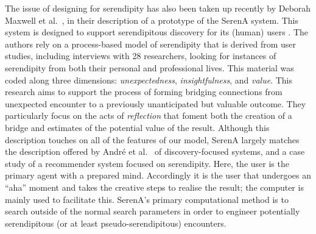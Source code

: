 The issue of designing for serendipity has also been taken up recently
by Deborah Maxwell et al.~\citeyear{maxwell2012designing}, in their
description of a prototype of the {\sf SerenA} system.  This system is
designed to support serendipitous discovery for its (human) users
\cite{forth2013serena}.  The authors rely on a process-based model of
serendipity \cite{Makri2012,Makri2012a} that is derived from user
studies, including interviews with 28 researchers, looking for
instances of serendipity from both their personal and professional
lives.  This material was coded along three dimensions:
\emph{unexpectedness}, \emph{insightfulness}, and \emph{value}.  This
research aims to support the process of forming bridging connections
from unexpected encounter to a previously unanticipated but valuable
outcome.  They particularly focus on the acts of \emph{reflection}
that foment both the creation of a bridge and estimates of the
potential value of the result.
%
Although this description touches on all of the features of our model, {\sf
  SerenA} largely matches the description offered by Andr{\'e} et
al.~\citeyear{andre2009discovery} of discovery-focused systems, and a
case study of a recommender system focused on serendipity.  Here, the
user is the primary agent with a prepared mind.  Accordingly it is the
user that undergoes an ``aha'' moment and takes the creative steps to
realise the result; the computer is mainly used to facilitate this.
{\sf SerenA}'s primary computational method is to search outside of
the normal search parameters in order to engineer potentially
serendipitous (or at least pseudo-serendipitous) encounters. 

